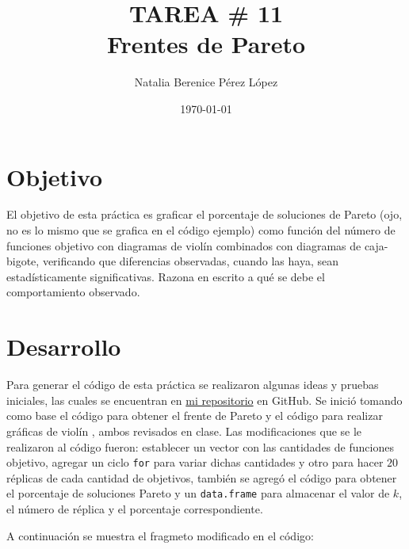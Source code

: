 \documentclass{article}
\title{TAREA \# 11 \\ Frentes de Pareto} %
\author{Natalia Berenice P\'{e}rez L\'{o}pez} %
\date{\today}
\begin{document}

\maketitle %

\section{Objetivo}
El objetivo de esta práctica es graficar el porcentaje de soluciones de Pareto (ojo, no es lo mismo que se grafica en el código ejemplo) como función del número de funciones objetivo con diagramas de violín combinados con diagramas de caja-bigote, verificando que diferencias observadas, cuando las haya, sean estadísticamente significativas. Razona en escrito a qué se debe el comportamiento observado.

\section{Desarrollo} %
Para generar el código de esta práctica se realizaron algunas ideas y pruebas iniciales, las cuales se encuentran en \href{https://github.com/nataliaperez0/Simulation/tree/main/Tarea11}{mi repositorio}  en GitHub. Se inició tomando como base el código para obtener el frente de Pareto \citep{1} y el código para realizar gráficas de violín \citep{2}, ambos revisados en clase. Las modificaciones que se le realizaron al código fueron: establecer un vector con las cantidades de funciones objetivo, agregar un ciclo \texttt{for} para variar dichas cantidades y otro para hacer $20$ réplicas de cada cantidad de objetivos, también se agregó el código para obtener el porcentaje de soluciones Pareto y un \texttt{data.frame} para almacenar el valor de $k$, el número de réplica y el porcentaje correspondiente.
\bigskip

A continuación se muestra el fragmeto modificado en el código: 


\end{document}
